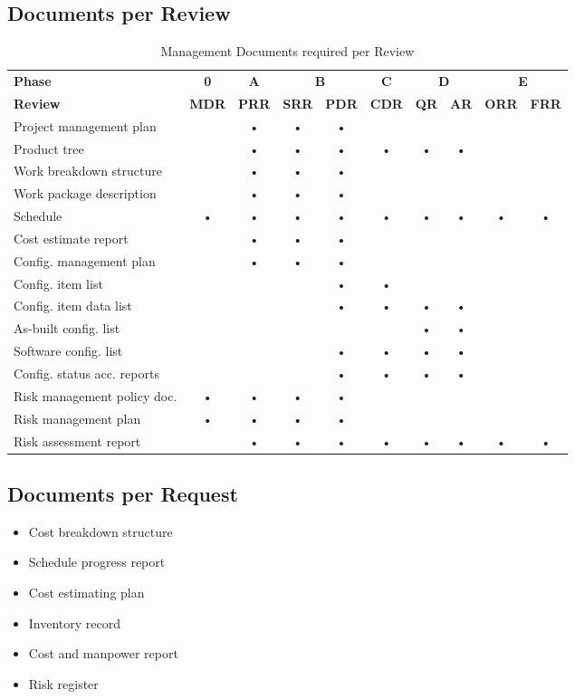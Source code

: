 \subsection{Documents per Review}
\begin{table}[h]
\centering
\begin{tabular}{l c c c c c c c c c}
\toprule
\textbf{Phase} & \textbf{0} & \textbf{A} & \multicolumn{2}{c}{\textbf{B}} & \textbf{C} & \multicolumn{2}{c}{\textbf{D}} & \multicolumn{2}{c}{\textbf{E}} \\
\textbf{Review} & \textbf{MDR} & \textbf{PRR} & \textbf{SRR} & \textbf{PDR} & \textbf{CDR} & \textbf{QR} & \textbf{AR} & \textbf{ORR} & \textbf{FRR} \\
\midrule
Project management plan         &   & •  & • & • &   &   &   &   &   \\
\hline
Product tree					&   & • & • & • & • & • & • &   &   \\
\hline
Work breakdown structure 		&   & • & • & • &   &   &   &   &   \\
\hline
Work package description     	&   & • & • & • &   &   &   &   &   \\
\hline
Schedule						& • & • & • & • & • & • & • & • & • \\
\hline
Cost estimate report			&   & • & • & • &   &   &   &   &   \\
\hline
Config. management plan 		&   & • & • & • &   &   &   &   &   \\
\hline
Config. item list				&   &   &   & • & • &   &   &   &   \\
\hline
Config. item data list			&   &   &   & • & • & • & • &   &   \\
\hline
As-built config. list			&   &   &   &   &   & • & • &   &   \\
\hline
Software config. list			&   &   &   & • & • & • & • &   &   \\
\hline
Config. status acc. reports		&   &   &   & • & • & • & • &   &   \\
\hline
Risk management policy doc.	    & • & • & • & • &   &   &   &   &   \\
\hline
Risk management plan			& • & • & • & • &   &   &   &   &   \\
\hline
Risk assessment report			&   & • & • & • & • & • & • & • & • \\
\bottomrule
\end{tabular}
\caption{Management Documents required per Review}
\end{table}

\subsection{Documents per Request}
\begin{itemize}
\item Cost breakdown structure
\item Schedule progress report
\item Cost estimating plan
\item Inventory record
\item Cost and manpower report
\item Risk register
\end{itemize}